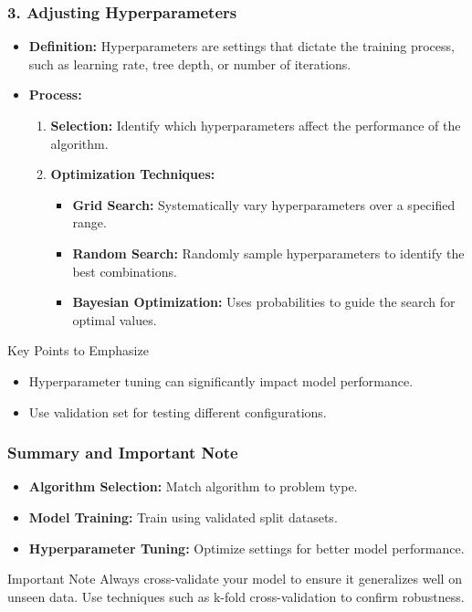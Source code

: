 \documentclass{beamer}
\begin{document}
\begin{frame}
    \frametitle{3. Adjusting Hyperparameters}
    \begin{itemize}
        \item \textbf{Definition:} Hyperparameters are settings that dictate the training process, such as learning rate, tree depth, or number of iterations.
        \item \textbf{Process:}
        \begin{enumerate}
            \item \textbf{Selection:} Identify which hyperparameters affect the performance of the algorithm.
            \item \textbf{Optimization Techniques:}
            \begin{itemize}
                \item \textbf{Grid Search:} Systematically vary hyperparameters over a specified range.
                \item \textbf{Random Search:} Randomly sample hyperparameters to identify the best combinations.
                \item \textbf{Bayesian Optimization:} Uses probabilities to guide the search for optimal values.
            \end{itemize}
        \end{enumerate}
    \end{itemize}
    
    \begin{block}{Key Points to Emphasize}
        \begin{itemize}
            \item Hyperparameter tuning can significantly impact model performance.
            \item Use validation set for testing different configurations.
        \end{itemize}
    \end{block}
\end{frame}

\begin{frame}
    \frametitle{Summary and Important Note}
    \begin{itemize}
        \item \textbf{Algorithm Selection:} Match algorithm to problem type.
        \item \textbf{Model Training:} Train using validated split datasets.
        \item \textbf{Hyperparameter Tuning:} Optimize settings for better model performance.
    \end{itemize}

    \begin{block}{Important Note}
        Always cross-validate your model to ensure it generalizes well on unseen data. Use techniques such as k-fold cross-validation to confirm robustness.
    \end{block}
\end{frame}
\end{document}
